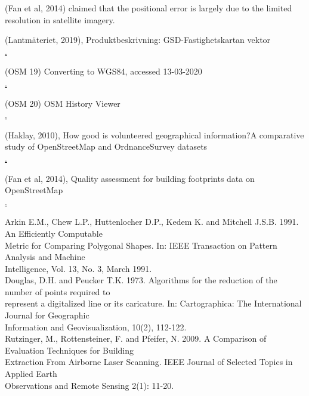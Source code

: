 \documentclass[a4paper]{article}
\begin{document}
(Fan et al, 2014) claimed that the positional error is largely due to the limited resolution in satellite imagery.

\begin{thebibliography}{9}

(Lantmäteriet, 2019), Produktbeskrivning: GSD-Fastighetskartan vektor \\ 
\href{https://www.lantmateriet.se/globalassets/kartor-och-geografisk-information/kartor/fastshmi.pdf}.

(OSM 19) Converting to WGS84, accessed 13-03-2020 \\ 
\href{https://wiki.openstreetmap.org/wiki/Converting\_to\_WGS84}.

(OSM 20) OSM History Viewer\\
\href{https://wiki.openstreetmap.org/wiki/OSM\_History\_Viewer}.

(Haklay, 2010), How good is volunteered geographical information?A comparative study of OpenStreetMap and OrdnanceSurvey datasets \\
\href{https://kfrichter.org/crowdsourcing-material/day1/haklay10.pdf}.

(Fan et al, 2014), Quality assessment for building footprints data on OpenStreetMap \\
\href{https://www.researchgate.net/publication/262163378\_Quality\_assessment\_for\_building\_footprints\_data\_on\_OpenStreetMap}.

Arkin E.M., Chew L.P., Huttenlocher D.P., Kedem K. and Mitchell J.S.B. 1991. An Efficiently Computable \\
Metric for Comparing Polygonal Shapes. In: IEEE Transaction on Pattern Analysis and Machine \\
Intelligence, Vol. 13, No. 3, March 1991. \\

Douglas, D.H. and Peucker T.K. 1973. Algorithms for the reduction of the number of points required to \\
represent a digitalized line or its caricature. In: Cartographica: The International Journal for Geographic \\
Information and Geovisualization, 10(2), 112-122. \\

Rutzinger, M., Rottensteiner, F. and Pfeifer, N. 2009. A Comparison of Evaluation Techniques for Building \\
Extraction From Airborne Laser Scanning. IEEE Journal of Selected Topics in Applied Earth \\
Observations and Remote Sensing 2(1): 11-20. \\


\end{thebibliography}
\end{document}
